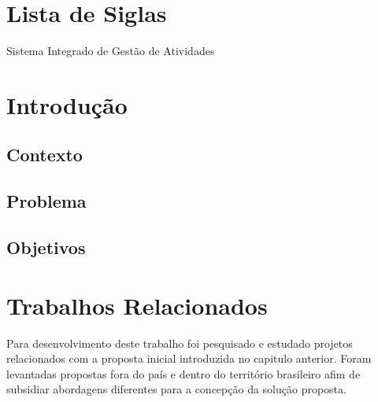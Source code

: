 \documentclass[12pt, a4paper]{report}
\begin{document}
\thispagestyle{empty}

\newpage
\tableofcontents
\thispagestyle{empty}


\listoffigures
\cleardoublepage


\listoftables
\cleardoublepage

\chapter*{Lista de Siglas}

\begin{acronym}
 {Sistema Integrado de Gestão de Atividades} 
\end{acronym}


\chapter{Introdução}
\section{Contexto}
\section{Problema}
\label{sec:problema}
\section{Objetivos}
\label{sec:obejtivos}

\chapter {Trabalhos Relacionados}
Para desenvolvimento deste trabalho foi pesquisado e estudado projetos relacionados com a proposta inicial introduzida no capitulo anterior. Foram levantadas propostas fora do país e dentro do território brasileiro afim de subsidiar abordagens diferentes para a concepção da solução proposta.
\end{document}
